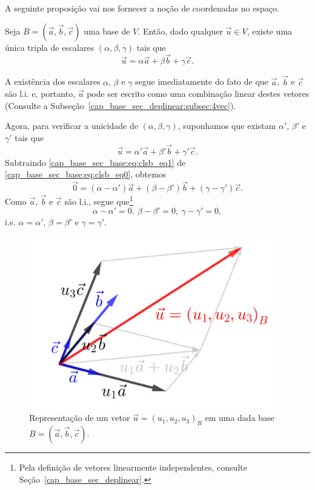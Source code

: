 A seguinte proposição vai nos fornecer a noção de coordenadas no espaço.

\begin{proposicao}
  Seja $B = \left(\vec{a}, \vec{b}, \vec{c}\right)$ uma base de $V$. Então, dado qualquer $\vec{u}\in V$, existe uma única tripla de escalares $\left(\alpha, \beta, \gamma\right)$ tais que
  \begin{equation}\label{cap_base_sec_base:eq:clsb_eq0}
    \vec{u} = \alpha\vec{a} + \beta\vec{b} + \gamma\vec{c}.
  \end{equation}  
\end{proposicao}
\begin{demonstracao}
  A existência dos escalares $\alpha$, $\beta$ e $\gamma$ segue imediatamente do fato de que $\vec{a}$, $\vec{b}$ e $\vec{c}$ são l.i. e, portanto, $\vec{u}$ pode ser escrito como uma combinação linear destes vetores (Consulte a Subseção~\ref{cap_base_sec_deplinear:subsec:4vec}). 
  
  Agora, para verificar a unicidade de $\left(\alpha, \beta, \gamma\right)$, suponhamos que existam $\alpha'$, $\beta'$ e $\gamma'$ tais que
\begin{equation}\label{cap_base_sec_base:eq:clsb_eq1}
  \vec{u} = \alpha'\vec{a} + \beta'\vec{b} + \gamma'\vec{c}.
\end{equation}
Subtraindo \eqref{cap_base_sec_base:eq:clsb_eq1} de \eqref{cap_base_sec_base:eq:clsb_eq0}, obtemos
\begin{equation}
  \vec{0} = (\alpha-\alpha')\vec{a}+(\beta-\beta')\vec{b}+(\gamma-\gamma')\vec{c}.
\end{equation}
Como $\vec{a}$, $\vec{b}$ e $\vec{c}$ são l.i., segue que\footnote{Pela definição de vetores linearmente independentes, consulte Seção~\ref{cap_base_sec_deplinear}.}
\begin{equation}
  \alpha-\alpha'=0,~\beta-\beta'=0,~\gamma-\gamma'=0,
\end{equation}
i.e. $\alpha=\alpha'$, $\beta=\beta'$ e $\gamma=\gamma'$.
\end{demonstracao}

\begin{figure}[h]
  \centering
  \includegraphics[width=4.25in]{./cap_base/dados/fig_coord/fig.jpg}
  \caption{Representação de um vetor $\vec{u} = (u_1, u_2, u_3)_B$ em uma dada base $B=(\vec{a},\vec{b},\vec{c})$.}
  \label{cap_base_sec_base:fig:coord}
\end{figure}

